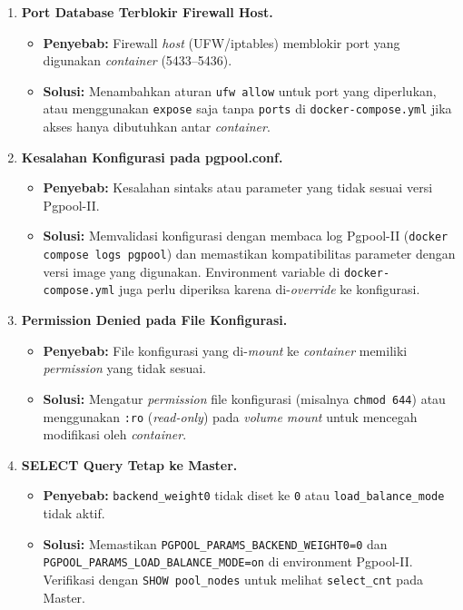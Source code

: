 \begin{enumerate}
    \item \textbf{Port Database Terblokir Firewall Host.}
    \begin{itemize}
        \item \textbf{Penyebab:} Firewall \textit{host} (UFW/iptables)
        memblokir port yang digunakan \textit{container}
        (5433--5436).
        \item \textbf{Solusi:} Menambahkan aturan \texttt{ufw allow}
        untuk port yang diperlukan, atau menggunakan \texttt{expose}
        saja tanpa \texttt{ports} di \texttt{docker-compose.yml} jika
        akses hanya dibutuhkan antar \textit{container}.
    \end{itemize}

    \item \textbf{Kesalahan Konfigurasi pada pgpool.conf.}
    \begin{itemize}
        \item \textbf{Penyebab:} Kesalahan sintaks atau parameter
        yang tidak sesuai versi Pgpool-II.
        \item \textbf{Solusi:} Memvalidasi konfigurasi dengan membaca
        log Pgpool-II (\texttt{docker compose logs pgpool}) dan
        memastikan kompatibilitas parameter dengan versi image yang
        digunakan. Environment variable di \texttt{docker-compose.yml}
        juga perlu diperiksa karena di-\textit{override} ke
        konfigurasi.
    \end{itemize}

    \item \textbf{Permission Denied pada File Konfigurasi.}
    \begin{itemize}
        \item \textbf{Penyebab:} File konfigurasi yang di-\textit{mount}
        ke \textit{container} memiliki \textit{permission} yang tidak
        sesuai.
        \item \textbf{Solusi:} Mengatur \textit{permission} file
        konfigurasi (misalnya \texttt{chmod 644}) atau menggunakan
        \texttt{:ro} (\textit{read-only}) pada \textit{volume mount}
        untuk mencegah modifikasi oleh \textit{container}.
    \end{itemize}

    \item \textbf{SELECT Query Tetap ke Master.}
    \begin{itemize}
        \item \textbf{Penyebab:} \texttt{backend\_weight0} tidak diset
        ke \texttt{0} atau \texttt{load\_balance\_mode} tidak aktif.
        \item \textbf{Solusi:} Memastikan
        \texttt{PGPOOL\_PARAMS\_BACKEND\_WEIGHT0=0} dan
        \texttt{PGPOOL\_PARAMS\_LOAD\_BALANCE\_MODE=on} di environment
        Pgpool-II. Verifikasi dengan \texttt{SHOW pool\_nodes} untuk
        melihat \texttt{select\_cnt} pada Master.
    \end{itemize}


\end{enumerate}
